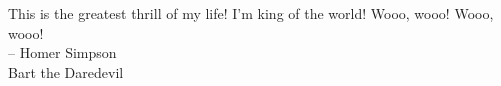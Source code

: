 \begin{minipage}{5in}
This is the greatest thrill of my life!  I'm king of the world!  Wooo,
wooo!  Wooo, wooo!\\

		-- Homer Simpson\\
		   Bart the Daredevil
\end{minipage}